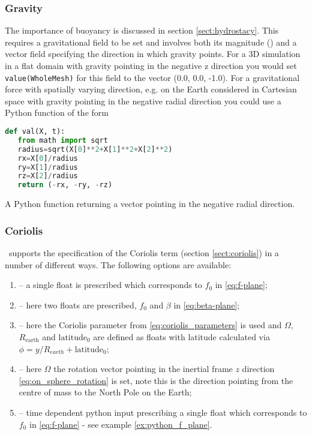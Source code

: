 \subsubsection{Gravity}\label{Sect:Gravity}
The importance of buoyancy is discussed in section \ref{sect:hydrostacy}. This
requires a gravitational field to be set and involves both its magnitude
(\eg \mss[9.8]) and a vector field specifying the direction in which gravity
points. For a 3D simulation in a flat domain with gravity pointing in the
negative z direction you would set \verb+value(WholeMesh)+ for this field to
the vector (0.0, 0.0, -1.0). For a gravitational force with spatially
varying direction, e.g. on the Earth considered in Cartesian space with
gravity pointing in the negative radial direction you could use a Python
function of the form
\begin{example}
  \begin{lstlisting}[language=Python]
def val(X, t):
   from math import sqrt
   radius=sqrt(X[0]**2+X[1]**2+X[2]**2)
   rx=X[0]/radius
   ry=X[1]/radius
   rz=X[2]/radius
   return (-rx, -ry, -rz)
  \end{lstlisting}
  \caption{A Python function returning a vector pointing in the negative radial direction.}
\end{example}

\subsubsection{Coriolis}

\fluidity\ supports the specification of the Coriolis term (section
\ref{sect:coriolis}) in a number of different ways. The following options
are available:

\begin{enumerate}
  \item {} -- a single float is prescribed which corresponds to
        $f_0$ in \eqref{eq:f-plane};
  \item {} -- here two floats are prescribed, $f_0$ and
        $\beta$ in \eqref{eq:beta-plane};
  \item {} -- here the Coriolis parameter from
        \eqref{eq:coriolis_parameters} is used and $\Omega$, 
        $R_{\textrm{earth}}$ and $\textrm{latitude}_0$ are defined as floats with
        latitude calculated via 
        $\phi = y/R_{earth} + \textrm{latitude}_0$;
  \item {} -- here $\Omega$ the rotation vector pointing in the
        inertial frame $z$ direction  \eqref{eq:on_sphere_rotation} is set,
        note this is the direction pointing from the centre of mass to the North
        Pole on the Earth;
 \item {} -- time dependent python input
       prescribing a single float which corresponds to
       $f_0$ in \eqref{eq:f-plane} - see example \ref{ex:python_f_plane}.
\end{enumerate}

